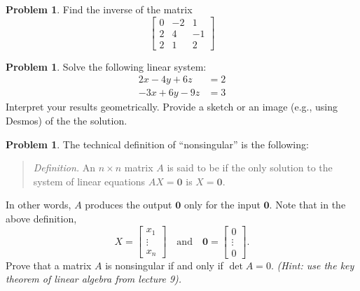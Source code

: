 \documentclass[10pt]{article}
\theoremstyle{definition}
\newtheorem{problem}[theorem]{Problem}
\newcommand{\1}[1]{\textbf{1}_{\left[#1\right]}} %
\newcommand{\dempfcolor}[1]{{\color{RoyalBlue}#1}}
\newcommand{\demph}[1]{\dempfcolor{{\sl #1}}}
\begin{document}
\begin{problem}
  Find the inverse of the matrix
  \begin{equation*}
    \begin{bmatrix}
      0&-2&1\\
      2&4&-1\\
      2&1&2
    \end{bmatrix}
  \end{equation*}
\end{problem}


\begin{problem}
  Solve the following linear system:
  \begin{align*}
    2x-4y+6z&=2\\
    -3x+6y-9z&=3
  \end{align*}
  Interpret your results geometrically. Provide a sketch or an image (e.g.,
  using Desmos) of the the solution.
\end{problem}

\begin{problem}
  The technical definition of ``nonsingular'' is the following:
  \begin{quote}
    \textit{Definition.} An $n\times n$ matrix $A$ is said to
    be \demph{\textbf{nonsingular}} if the only solution to the system of linear
    equations $AX=\mathbf{0}$ is $X=\mathbf{0}$.
  \end{quote}
  In other words, $A$ produces the output $\mathbf{0}$ only for the input
  $\mathbf{0}$. Note that in the above definition,
  \begin{equation*}
    X=
    \begin{bmatrix}
      x_{1}\\
      \vdots\\
      x_{n}
    \end{bmatrix}
    \quad \text{and} \quad 
    \mathbf{0}=
    \begin{bmatrix}
      0\\
      \vdots\\
      0
    \end{bmatrix}.
  \end{equation*}
  Prove that a matrix $A$ is nonsingular if and only if $\det A=0$.
  \textit{(Hint: use the key theorem of linear algebra from lecture 9).}
\end{problem}
\end{document}

